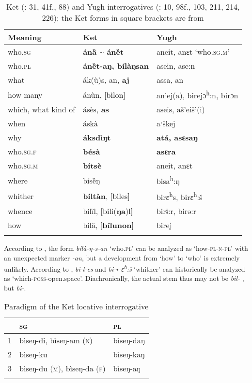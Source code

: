 \begin{table}
\caption{Ket (\citealt{Vajda2004}: 31, 41f., 88) and Yugh interrogatives (\citealt{Werner1997b}: 10, 98f., 103, 211, 214, 226); the Ket forms in square brackets are from \citet[167]{Georg2007}}
\label{tab:yeni:2}

\begin{tabularx}{\textwidth}{XXl}
\lsptoprule

\textbf{Meaning} & \textbf{Ket} & \textbf{Yugh}\\
\midrule
who.\textsc{sg} & \textbf{ánȁ {\textasciitilde} ánȅt} & aneit, anɛt ‘who.\textsc{sg.m}’\\
who.\textsc{pl} & \textbf{ánȅt-aŋ, bílàŋsan} & asein, ase:n\\
what & ák(ù)s, an, \textbf{aj} & assa, an\\
how many & ánùn, [bìlon] & an’ej(a), birejɔ\textsuperscript{h}:n, birɔn\\
which, what kind of & ásès, \textbf{as} & aseis, aš’eiš’(i)\\
when & áskà & aˑškej\\
why & \textbf{áksdìŋt} & \textbf{atá, asɛsaŋ}\\
who.\textsc{sg.f} & \textbf{bésà} & \textbf{asɛra}\\
who.\textsc{sg.m} & \textbf{bítsè} & aneit, anɛt\\
where & bísȅŋ & bisa\textsuperscript{h}:ŋ\\
whither & \textbf{bíltàn}, [bìles] & birɛ\textsuperscript{h}s, birɛ\textsuperscript{h}:š\\
whence & bílȉl, [bili(\textbf{ŋa})l] & birɨ:r, birə:r\\
how & bílȁ, [\textbf{bílunon}] & birej\\
\lspbottomrule
\end{tabularx}
\end{table}

According to \citet[165]{Georg2007}, the form \textit{bílà-ŋ-s-an} ‘who.\textsc{pl}’ can be analyzed as ‘how-\textsc{pl}-\textsc{n}-\textsc{pl}’ with an unexpected  marker \textit{-an}, but a development from ‘how’ to ‘who’ is extremely unlikely. According to \citet[89]{Vajda2013},  \textit{bì-l-es} and  \textit{bi-r-ɛ\textsuperscript{h}}\textit{:š} ‘whither’ can historically be analyzed as ‘which-\textsc{poss}-open.space’. Diachronically, the actual stem thus may not be \textit{bil-} \citep[167]{Georg2007}, but \textit{bi-}.

\begin{table}
\caption{Paradigm of the Ket locative interrogative \citep[167]{Georg2007}}
\label{tab:yeni:3}

\begin{tabularx}{\textwidth}{XXl}
\lsptoprule
& \textbf{\textsc{sg}} & \textbf{\textsc{pl}}\\
\midrule
\textsc{1} & bìseŋ-di, bìseŋ-am (\textsc{n}) & bìseŋ-daŋ\\
\textsc{2} & bìseŋ-ku & bìseŋ-kaŋ\\
\textsc{3} & bìseŋ-du (\textsc{m}), bìseŋ-da (\textsc{f}) & bìseŋ-aŋ\\
\lspbottomrule
\end{tabularx}
\end{table}

